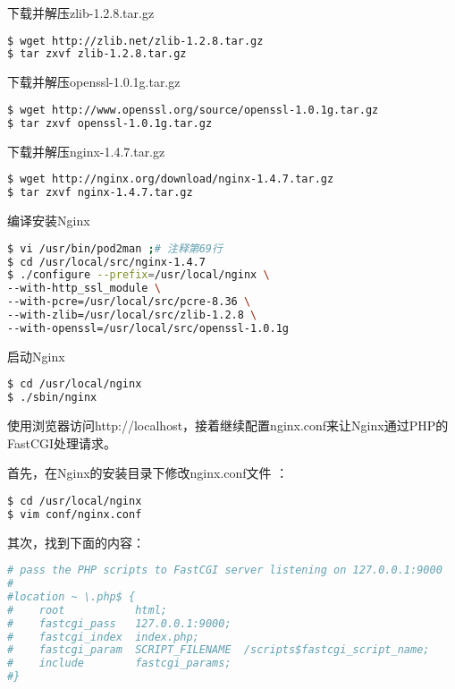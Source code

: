 下载并解压zlib-1.2.8.tar.gz


\begin{lstlisting}[language=bash]
$ wget http://zlib.net/zlib-1.2.8.tar.gz
$ tar zxvf zlib-1.2.8.tar.gz
\end{lstlisting}

下载并解压openssl-1.0.1g.tar.gz


\begin{lstlisting}[language=bash]
$ wget http://www.openssl.org/source/openssl-1.0.1g.tar.gz
$ tar zxvf openssl-1.0.1g.tar.gz
\end{lstlisting}

下载并解压nginx-1.4.7.tar.gz


\begin{lstlisting}[language=bash]
$ wget http://nginx.org/download/nginx-1.4.7.tar.gz
$ tar zxvf nginx-1.4.7.tar.gz
\end{lstlisting}


编译安装Nginx


\begin{lstlisting}[language=bash]
$ vi /usr/bin/pod2man ;# 注释第69行
$ cd /usr/local/src/nginx-1.4.7
$ ./configure --prefix=/usr/local/nginx \
--with-http_ssl_module \
--with-pcre=/usr/local/src/pcre-8.36 \
--with-zlib=/usr/local/src/zlib-1.2.8 \
--with-openssl=/usr/local/src/openssl-1.0.1g
\end{lstlisting}

启动Nginx

\begin{lstlisting}[language=bash]
$ cd /usr/local/nginx
$ ./sbin/nginx
\end{lstlisting}

使用浏览器访问http://localhost，接着继续配置nginx.conf来让Nginx通过PHP的FastCGI处理请求。

首先，在Nginx的安装目录下修改nginx.conf文件	：


\begin{lstlisting}[language=bash]
$ cd /usr/local/nginx
$ vim conf/nginx.conf
\end{lstlisting}

其次，找到下面的内容：


\begin{lstlisting}[language=bash]
# pass the PHP scripts to FastCGI server listening on 127.0.0.1:9000
#
#location ~ \.php$ {
#    root           html;
#    fastcgi_pass   127.0.0.1:9000;
#    fastcgi_index  index.php;
#    fastcgi_param  SCRIPT_FILENAME  /scripts$fastcgi_script_name;
#    include        fastcgi_params;
#}
\end{lstlisting}


